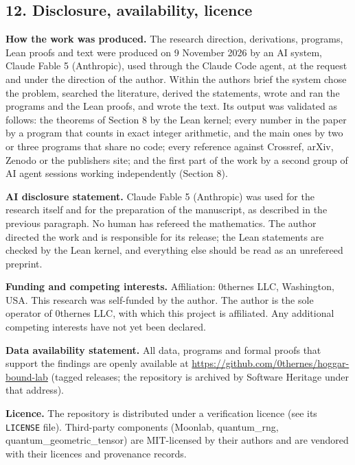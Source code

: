 \documentclass[11pt,a4paper]{article}
\begin{document}
\subsection{12. Disclosure, availability, licence}\label{12-disclosure-availability-licence}

\textbf{How the work was produced.} The research direction, derivations, programs, Lean proofs and text were
produced on 9 November 2026 by an AI system, Claude Fable 5 (Anthropic), used through the Claude Code
agent, at the request and under the direction of the author. Within the author\textquotesingle s brief the system
chose the problem, searched the literature, derived the statements, wrote and ran the programs and the
Lean proofs, and wrote the text. Its output was validated as follows: the theorems of Section 8 by the
Lean kernel; every number in the paper by a program that counts in exact integer arithmetic, and the
main ones by two or three programs that share no code; every reference against Crossref, arXiv, Zenodo
or the publisher\textquotesingle s site; and the first part of the work by a second group of AI agent sessions working
independently (Section 8).

\textbf{AI disclosure statement.} Claude Fable 5 (Anthropic) was used for the research itself and for the
preparation of the manuscript, as described in the previous paragraph. No human has refereed the
mathematics. The author directed the work and is responsible for its release; the Lean statements are
checked by the Lean kernel, and everything else should be read as an unrefereed preprint.

\textbf{Funding and competing interests.} Affiliation: 0thernes LLC, Washington, USA. This research was
self-funded by the author. The author is the sole operator of 0thernes LLC, with which this project is
affiliated. Any additional competing interests have not yet been declared.

\textbf{Data availability statement.} All data, programs and formal proofs that support the findings are
openly available at \url{https://github.com/0thernes/hoggar-bound-lab} (tagged releases; the repository is
archived by Software Heritage under that address).

\textbf{Licence.} The repository is distributed under a verification licence (see its \texttt{LICENSE} file).
Third-party components (Moonlab, quantum\_rng, quantum\_geometric\_tensor) are MIT-licensed by their
authors and are vendored with their licences and provenance records.
\end{document}
